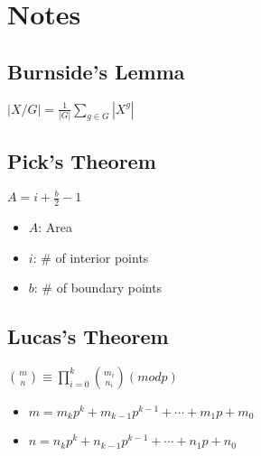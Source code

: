 \section{Notes}
    \subsection{Burnside's Lemma}
        \large $\left | X / G \right | = \frac{1}{\left | G \right |}\sum_{g \in G}\left | X^g \right |$
    \subsection{Pick's Theorem}
        \large $A = i + \frac{b}{2} - 1$
        \small
        \begin{itemize}
            \item $A$: Area
            \item $i$: \# of interior points
            \item $b$: \# of boundary points
        \end{itemize}
    \subsection{Lucas's Theorem}
        \large $\binom{m}{n}\equiv \prod_{i=0}^k \binom{m_i}{n_i} (mod p)$
        \small
        \begin{itemize}
            \item $m = m_kp^k + m_{k-1}p^{k-1} + \cdots + m_1p + m_0$
            \item $n = n_kp^k + n_{k-1}p^{k-1} + \cdots + n_1p + n_0$
        \end{itemize}
